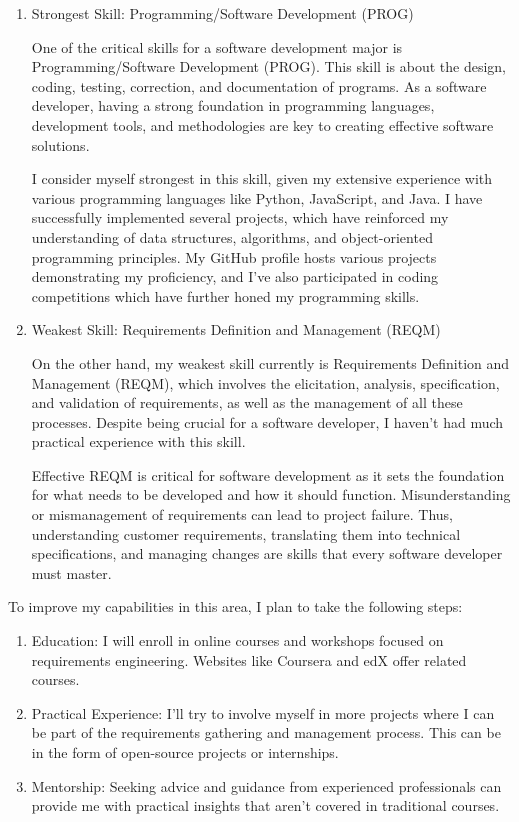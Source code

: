 \documentclass[a4paper, 11pt]{report}
\begin{document}
\begin{enumerate}   

\item Strongest Skill: Programming/Software Development (PROG)

One of the critical skills for a software development major is Programming/Software Development (PROG). This skill is about the design, coding, testing, correction, and documentation of programs. As a software developer, having a strong foundation in programming languages, development tools, and methodologies are key to creating effective software solutions.

I consider myself strongest in this skill, given my extensive experience with various programming languages like Python, JavaScript, and Java. I have successfully implemented several projects, which have reinforced my understanding of data structures, algorithms, and object-oriented programming principles. My GitHub profile hosts various projects demonstrating my proficiency, and I've also participated in coding competitions which have further honed my programming skills.

\item Weakest Skill: Requirements Definition and Management (REQM)

On the other hand, my weakest skill currently is Requirements Definition and Management (REQM), which involves the elicitation, analysis, specification, and validation of requirements, as well as the management of all these processes. Despite being crucial for a software developer, I haven't had much practical experience with this skill.

Effective REQM is critical for software development as it sets the foundation for what needs to be developed and how it should function. Misunderstanding or mismanagement of requirements can lead to project failure. Thus, understanding customer requirements, translating them into technical specifications, and managing changes are skills that every software developer must master.
\end{enumerate}

To improve my capabilities in this area, I plan to take the following steps:
\begin{enumerate}
\item Education: I will enroll in online courses and workshops focused on requirements engineering. Websites like Coursera and edX offer related courses.

\item Practical Experience: I'll try to involve myself in more projects where I can be part of the requirements gathering and management process. This can be in the form of open-source projects or internships.

\item Mentorship: Seeking advice and guidance from experienced professionals can provide me with practical insights that aren't covered in traditional courses.
\end{enumerate}
\end{document}
